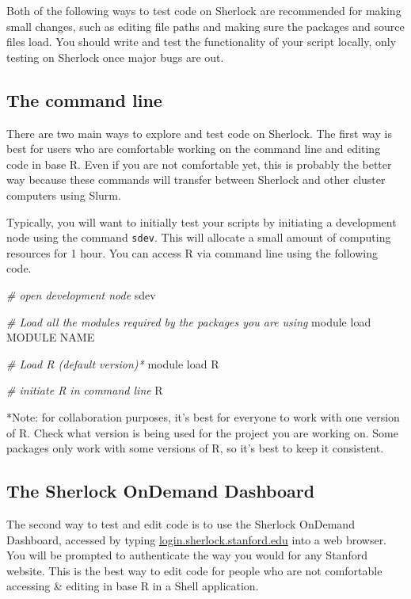 \documentclass[
]{book}
\newenvironment{Shaded}{\begin{snugshade}}{\end{snugshade}}
\newcommand{\CommentTok}[1]{\textcolor[rgb]{0.56,0.35,0.01}{\textit{#1}}}
\newcommand{\ExtensionTok}[1]{#1}
\newcommand{\NormalTok}[1]{#1}
\begin{document}
Both of the following ways to test code on Sherlock are recommended for making small changes, such as editing file paths and making sure the packages and source files load. You should write and test the functionality of your script locally, only testing on Sherlock once major bugs are out.

\subsection{The command line}\label{the-command-line}

There are two main ways to explore and test code on Sherlock. The first way is best for users who are comfortable working on the command line and editing code in base R. Even if you are not comfortable yet, this is probably the better way because these commands will transfer between Sherlock and other cluster computers using Slurm.

Typically, you will want to initially test your scripts by initiating a development node using the command \texttt{sdev}. This will allocate a small amount of computing resources for 1 hour. You can access R via command line using the following code.

\begin{Shaded}
\begin{Highlighting}[]
\CommentTok{\# open development node}
\ExtensionTok{sdev}

\CommentTok{\# Load all the modules required by the packages you are using}
\ExtensionTok{module}\NormalTok{ load MODULE NAME  }

\CommentTok{\# Load R (default version)*}
\ExtensionTok{module}\NormalTok{ load R }

\CommentTok{\# initiate R in command line}
\ExtensionTok{R}
\end{Highlighting}
\end{Shaded}

*Note: for collaboration purposes, it's best for everyone to work with one version of R. Check what version is being used for the project you are working on. Some packages only work with some versions of R, so it's best to keep it consistent.

\subsection{The Sherlock OnDemand Dashboard}\label{the-sherlock-ondemand-dashboard}

The second way to test and edit code is to use the Sherlock OnDemand Dashboard, accessed by typing \url{login.sherlock.stanford.edu} into a web browser. You will be prompted to authenticate the way you would for any Stanford website. This is the best way to edit code for people who are not comfortable accessing \& editing in base R in a Shell application.
\end{document}
